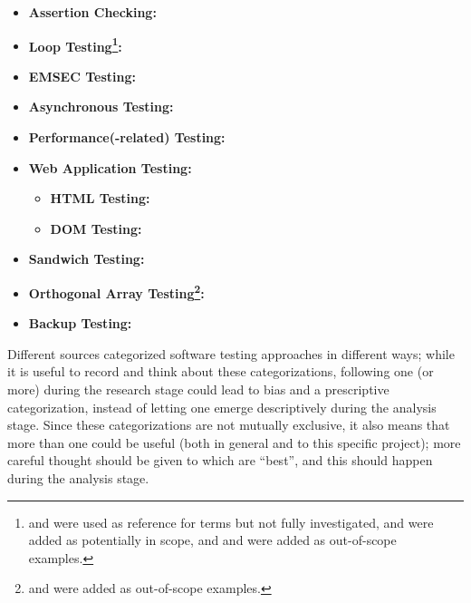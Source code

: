 \begin{itemize}
      \item \textbf{Assertion Checking:} \citet{LahiriEtAl2013, ChalinEtAl2006,
                  BerdineEtAl2006}
      \item \textbf{Loop Testing\footnote{\citep{ISO2015} and \citep{ISO2022}
                        were used as reference for terms but not fully
                        investigated, \citep{TrudnowskiEtAl2017} and
                        \citep{PierreEtAl2017} were added as potentially in
                        scope, and \citep{Goralski1999} and
                        \citep{Dominguez-PumarEtAl2020} were added as
                        out-of-scope examples.}:} \citet{DhokAndRamanathan2016,
                  GodefroidAndLuchaup2011, PreußeEtAl2012,
                  ForsythEtAl2004}
      \item \textbf{EMSEC Testing:} \citet{ZhouEtAl2012, ISO2021}
      \item \textbf{Asynchronous Testing:} \citet{JardEtAl1999}
      \item \textbf{Performance(-related) Testing:} \citet{Moghadam2019}
      \item \textbf{Web Application Testing:} \citet{DoğanEtAl2014, Kam2008}
            \begin{itemize}
                  \item \textbf{HTML Testing:} \citet{ChoudharyEtAl2010,
                              SneedAndGöschl2000, Gerrard2000b}
                  \item \textbf{DOM Testing:} \citet{BajammalAndMesbah2018}
            \end{itemize}
      \item \textbf{Sandwich Testing:} \citet{SharmaEtAl2021,
                  SangwanAndLaPlante2006}
      \item \textbf{Orthogonal Array Testing\footnote{
                        \citep{YuEtAl2011} and \citep{Tsui2007} were added as
                        out-of-scope examples.}:} \citet{Mandl1985, Valcheva2013}
      \item \textbf{Backup Testing:}
            \citet{Bas2024}
\end{itemize}

Different sources categorized software testing approaches in different ways;
while it is useful to record and think about these
categorizations, following one (or more)
during the research
stage could lead to bias and a prescriptive categorization, instead of letting
one emerge descriptively during the analysis stage. Since these categorizations
are not mutually exclusive, it also means that more than one could be useful
(both in general and to this specific project); more careful thought should be
given to which are ``best'', and this should happen during the analysis stage.
